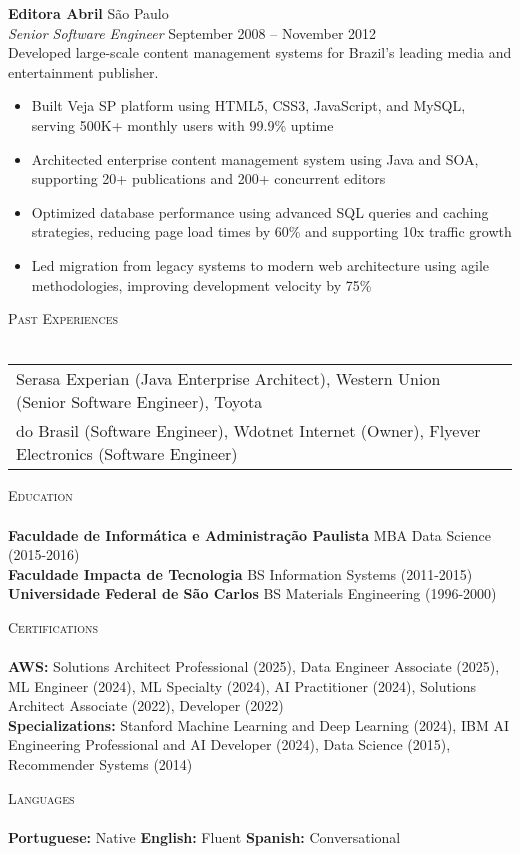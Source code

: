 \documentclass[a4paper]{article}
\newcommand{\lineunder} {
    \vspace*{-8pt} \\
    \hspace*{-18pt} \hrulefill \\
}
\newcommand{\header} [1] {
    {\hspace*{-18pt}\vspace*{6pt} \textsc{#1}}
    \vspace*{-6pt} \lineunder
}
\begin{document}
\textbf{Editora Abril} \hfill São Paulo\\
\textit{Senior Software Engineer} \hfill September 2008 – November 2012\\
\vspace{0.5mm}
Developed large-scale content management systems for Brazil's leading media and entertainment publisher.
\vspace{-2mm}
\begin{itemize}
\setlength\itemsep{-1mm}
\item Built Veja SP platform using HTML5, CSS3, JavaScript, and MySQL, serving 500K+ monthly users with 99.9\% uptime
\item Architected enterprise content management system using Java and SOA, supporting 20+ publications and 200+ concurrent editors
\item Optimized database performance using advanced SQL queries and caching strategies, reducing page load times by 60\% and supporting 10x traffic growth
\item Led migration from legacy systems to modern web architecture using agile methodologies, improving development velocity by 75\%
\end{itemize}

\header{Past Experiences}
\vspace{0.75mm}
\begin{tabular}{ @{}l l }
    Serasa Experian (Java Enterprise Architect), Western Union (Senior Software Engineer), Toyota \\ do Brasil (Software Engineer), Wdotnet Internet (Owner), Flyever Electronics (Software Engineer) \\
\end{tabular}

\header{Education}
\vspace{0.5mm}
\textbf{Faculdade de Informática e Administração Paulista} \hfill MBA Data Science (2015-2016) \\
\textbf{Faculdade Impacta de Tecnologia} \hfill BS Information Systems (2011-2015) \\
\textbf{Universidade Federal de São Carlos} \hfill BS Materials Engineering (1996-2000) \\
\vspace{0.5mm}

\header{Certifications}
\vspace{0.5mm}
\textbf{AWS:} Solutions Architect Professional (2025), Data Engineer Associate (2025), ML Engineer (2024), ML Specialty (2024), AI Practitioner (2024), Solutions Architect Associate (2022), Developer (2022) \\
\textbf{Specializations:} Stanford Machine Learning and Deep Learning (2024), IBM AI Engineering Professional and AI Developer (2024), Data Science (2015), Recommender Systems (2014) 

\header{Languages}
\vspace{0.5mm}
\textbf{Portuguese:} Native \hfill \textbf{English:} Fluent \hfill \textbf{Spanish:} Conversational
\end{document}
